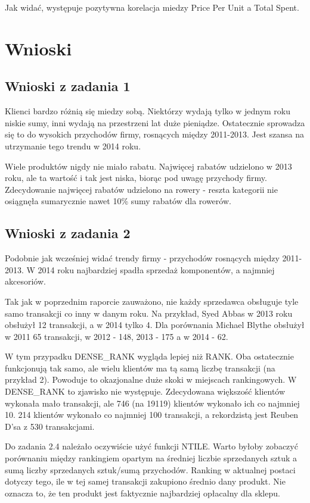 \documentclass[a4paper,12pt]{article}
\begin{document}
Jak widać, występuje pozytywna korelacja miedzy Price Per Unit a Total Spent.

\section{Wnioski}

\subsection{Wnioski z zadania 1}

Klienci bardzo różnią się miedzy sobą. Niektórzy wydają tylko w jednym roku niskie sumy, inni wydają na przestrzeni lat duże pieniądze. Ostatecznie sprowadza się to do wysokich przychodów firmy, rosnących między 2011-2013. Jest szansa na utrzymanie tego trendu w 2014 roku.

Wiele produktów nigdy nie miało rabatu. Najwięcej rabatów udzielono w 2013 roku, ale ta wartość i tak jest niska, biorąc pod uwagę przychody firmy.
Zdecydowanie najwięcej rabatów udzielono na rowery - reszta kategorii nie osiągnęła sumarycznie nawet 10\% sumy rabatów dla rowerów.

\subsection{Wnioski z zadania 2}

Podobnie jak wcześniej widać trendy firmy - przychodów rosnących między 2011-2013. W 2014 roku najbardziej spadła sprzedaż komponentów, a najmniej akcesoriów.

Tak jak w poprzednim raporcie zauważono, nie każdy sprzedawca obsługuje tyle samo transakcji co inny w danym roku. Na przykład, Syed Abbas w 2013 roku obsłużył 12 transakcji, a w 2014 tylko 4. Dla porównania Michael Blythe obsłużył w 2011 65 transakcji, w 2012 - 148, 2013 - 175 a w 2014 - 62.

W tym przypadku DENSE\_RANK wygląda lepiej niż RANK. Oba ostatecznie funkcjonują tak samo, ale wielu klientów ma tą samą liczbę transakcji (na przykład 2). Powoduje to okazjonalne duże skoki w miejscach rankingowych. W DENSE\_RANK to zjawisko nie występuje. Zdecydowana większość klientów wykonała mało transakcji, ale 746 (na 19119) klientów wykonało ich co najmniej 10. 214 klientów wykonało co najmniej 100 transakcji, a rekordzistą jest Reuben D'sa z 530 transakcjami.

Do zadania 2.4 należało oczywiście użyć funkcji NTILE. Warto byłoby zobaczyć porównaniu między rankingiem opartym na średniej liczbie sprzedanych sztuk a sumą liczby sprzedanych sztuk/sumą przychodów. Ranking w aktualnej postaci dotyczy tego, ile w tej samej transakcji zakupiono średnio dany produkt. Nie oznacza to, że ten produkt jest faktycznie najbardziej opłacalny dla sklepu.
\end{document}
